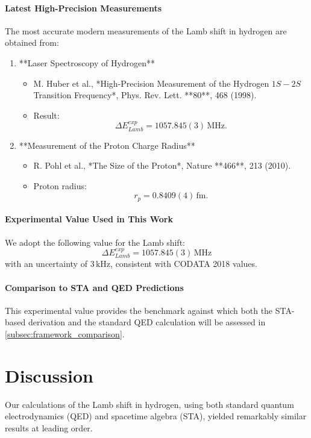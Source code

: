 \documentclass[12pt]{article}
\begin{document}
\paragraph{Latest High-Precision Measurements}
The most accurate modern measurements of the Lamb shift in hydrogen are obtained from:
\begin{enumerate}
    \item **Laser Spectroscopy of Hydrogen**
    \begin{itemize}
        \item M. Huber et al., *High-Precision Measurement of the Hydrogen \(1S-2S\) Transition Frequency*, Phys. Rev. Lett. **80**, 468 (1998).
        \item Result:  
        \[
        \Delta E_{Lamb}^{exp} = 1057.845(3)\,\mathrm{MHz}.
        \]
    \end{itemize}
    \item **Measurement of the Proton Charge Radius**
    \begin{itemize}
        \item R. Pohl et al., *The Size of the Proton*, Nature **466**, 213 (2010).  
        \item Proton radius:  
        \[
        r_p = 0.8409(4)\,\mathrm{fm}.
        \]
    \end{itemize}
\end{enumerate}

\paragraph{Experimental Value Used in This Work}
We adopt the following value for the Lamb shift:
\[
\boxed{\Delta E_{Lamb}^{exp} = 1057.845(3)\,\mathrm{MHz}}
\]
with an uncertainty of \(3\,\mathrm{kHz}\), consistent with CODATA 2018 values.

\paragraph{Comparison to STA and QED Predictions}
This experimental value provides the benchmark against which both the STA-based derivation and the standard QED calculation will be assessed in \ref{subsec:framework_comparison}.


\section{Discussion}\label{sec:discussion}

Our calculations of the Lamb shift in hydrogen, using both standard quantum electrodynamics (QED) and spacetime algebra (STA), yielded remarkably similar results at leading order.  
\end{document}

